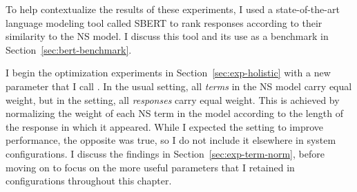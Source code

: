 


To help contextualize the results of these experiments, I used a state-of-the-art language modeling tool called SBERT to rank responses according to their similarity to the NS model. I discuss this tool and its use as a benchmark in Section~\ref{sec:bert-benchmark}.

I begin the optimization experiments in Section~\ref{sec:exp-holistic} with a new parameter that I call . In the usual  setting, all \textit{terms} in the NS model carry equal weight, but in the  setting, all \textit{responses} carry equal weight. This is achieved by normalizing the weight of each NS term in the model according to the length of the response in which it appeared. While I expected the  setting to improve performance, the opposite was true, so I do not include it elsewhere in system configurations. I discuss the findings in Section~\ref{sec:exp-term-norm}, before moving on to focus on the more useful parameters that I retained in configurations throughout this chapter.


